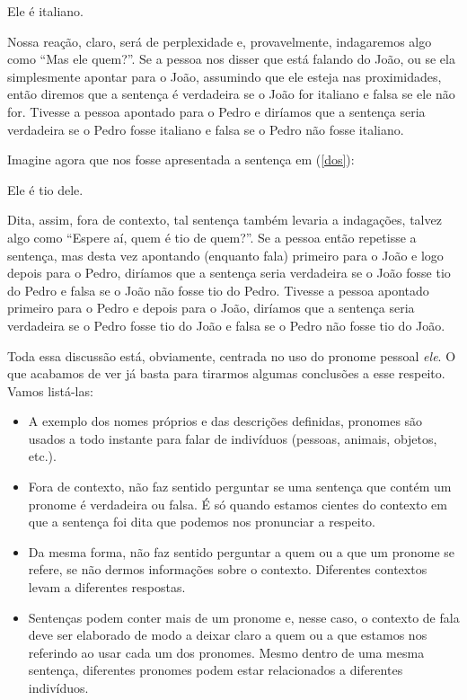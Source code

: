 \begin{exe}
\ex Ele é italiano.\label{pro}
\end{exe}

\n Nossa reação, claro, será de perplexidade e, provavelmente, indagaremos algo como ``Mas ele quem?''. Se a pessoa nos disser
que está falando do João, ou se ela simplesmente apontar para
o João, assumindo que ele esteja nas proximidades, então diremos
que a sentença é verdadeira se o João for italiano e falsa se ele
não for. Tivesse a pessoa apontado para o Pedro e diríamos que a
sentença seria verdadeira se o Pedro fosse italiano e falsa se o
Pedro não fosse italiano.

Imagine agora que nos fosse apresentada a sentença em (\ref{dos}):

\begin{exe}
\ex Ele é tio dele.\label{dos}
\end{exe}

Dita, assim, fora de contexto, tal sentença também levaria a
indagações, talvez algo como ``Espere aí, quem é tio de quem?''.
Se a pessoa então repetisse a sentença, mas desta vez apontando
(enquanto fala) primeiro para o João e logo depois para o Pedro,
diríamos que a sentença seria verdadeira se o João fosse tio do
Pedro e falsa se o João não fosse tio do Pedro. Tivesse a pessoa
apontado primeiro para o Pedro e depois para o João, diríamos que
a sentença seria verdadeira se o Pedro fosse tio do João e falsa
se o Pedro não fosse tio do João.

Toda essa discussão está, obviamente, centrada  no uso do pronome
pessoal \textit{ele}. O que acabamos de ver já basta para tirarmos
algumas conclusões a esse respeito. Vamos listá-las:

\begin{itemize}

\item A exemplo dos nomes próprios e das descrições definidas, pronomes são usados a todo instante para falar de indivíduos (pessoas, animais, objetos, etc.).

\item Fora de contexto, não faz sentido perguntar se uma
    sentença que contém um pronome é verdadeira ou falsa. É só
    quando estamos cientes do contexto em que a sentença foi
    dita que podemos nos pronunciar a respeito.

\item Da mesma forma, não faz sentido perguntar a quem ou a que
    um pronome se refere, se não dermos informações sobre o
    contexto. Diferentes contextos levam a diferentes
    respostas.

\item Sentenças podem conter mais de um pronome e, nesse caso,
    o contexto de fala deve ser elaborado de modo a deixar
    claro a quem ou a que estamos nos referindo ao usar cada
    um dos pronomes. Mesmo dentro de uma mesma sentença,
    diferentes pronomes podem estar relacionados a diferentes
    indivíduos.

\end{itemize}



